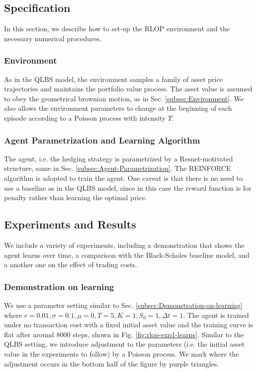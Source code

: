 \subsection{Specification}

In this section, we describe how to set-up the RLOP environment and
the necessary numerical procedures.

\subsubsection{Environment}

As in the QLBS model, the environment samples a family of asset price
trajectories and maintains the portfolio value process. The asset
value is assumed to obey the geometrical brownian motion, as in Sec.
\ref{subsec:Environment}. We also allows the environment parameters
to change at the beginning of each episode according to a Poisson
process with intensity $\varUpsilon$.

\subsubsection{Agent Parametrization and Learning Algorithm}

The agent, i.e. the hedging strategy is parametrized by a Resnet-motivated
structure, same in Sec. \ref{subsec:Agent-Parametrization}. The REINFORCE
algorithm is adopted to train the agent. One caveat is that there
is no need to use a baseline as in the QLBS model, since in this case
the reward function is for penalty rather than learning the optimal
price.

\subsection{Experiments and Results}

We include a variety of experiments, including a demonstration that
shows the agent learns over time, a comparison with the Black-Scholes
baseline model, and a another one on the effect of trading costs.

\subsubsection{Demonstration on learning\label{subsec:Demonstration-on-learning-rlop}}

We use a parameter setting similar to Sec. \ref{subsec:Demonstration-on-learning}
where $r=0.01,\sigma=0.1,\mu=0,T=5,K=1,S_{0}=1,\Delta t=1$. The agent
is trained under no transaction cost with a fixed initial asset value
and the training curve is flat after around 8000 steps, shown in Fig.
\ref{fig:rlop-exp1-learns}. Similar to the QLBS setting, we introduce
adjustment to the parameters (i.e. the initial asset value in the
experiments to follow) by a Poisson process. We mark where the adjustment
occurs in the bottom half of the figure by purple triangles.

